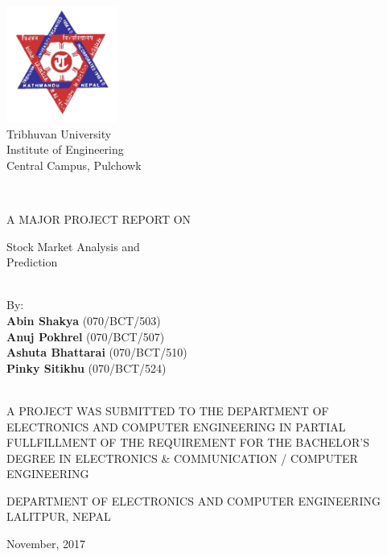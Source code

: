 

{
  \thispagestyle{empty}
  \centering
  \normalsize

  \includegraphics[height=1.5in]{fig/tu}\\
  {\Large\sc Tribhuvan University}\\
  {\Large\sc Institute of Engineering}\\
  Central Campus, Pulchowk

  ~

  A MAJOR PROJECT REPORT ON

  {\Huge\sc Stock Market Analysis and \\[5pt] Prediction}\\

  ~

  By:\\
  {\bf Abin Shakya} (070/BCT/503)\\
  {\bf Anuj Pokhrel} (070/BCT/507)\\
  {\bf Ashuta Bhattarai} (070/BCT/510)\\
  {\bf Pinky Sitikhu} (070/BCT/524)\\

  ~

  A PROJECT WAS SUBMITTED TO THE DEPARTMENT OF ELECTRONICS AND COMPUTER
  ENGINEERING IN PARTIAL FULLFILLMENT OF THE REQUIREMENT FOR THE BACHELOR'S
  DEGREE IN ELECTRONICS \& COMMUNICATION / COMPUTER ENGINEERING

  
  DEPARTMENT OF ELECTRONICS AND COMPUTER ENGINEERING\\
  LALITPUR, NEPAL

  \large
  November, 2017

}

